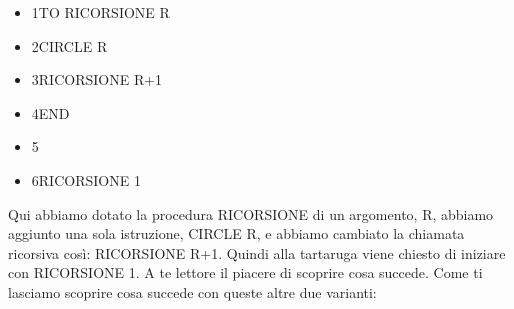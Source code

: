 \begin{table}[H]
\begin{minipage}{1.0\textwidth}
\begin{itemize}[itemsep=-3pt,parsep=2pt]
\item[] \hspace{0.5cm}  1\hspace{8pt}TO RICORSIONE R 
\item[] \hspace{0.5cm}  2\hspace{8pt}\hspace{8pt}CIRCLE R
\item[] \hspace{0.5cm}  3\hspace{8pt}\hspace{8pt}RICORSIONE R+1
\item[] \hspace{0.5cm}	4\hspace{8pt}END
\item[] \hspace{0.5cm}  5\hspace{8pt}
\item[] \hspace{0.5cm}  6\hspace{8pt}RICORSIONE 1
\end{itemize}          	          
\end{minipage}
\end{table}
\vskip 1cm

Qui abbiamo dotato la procedura RICORSIONE di un argomento, R, abbiamo aggiunto una sola istruzione, CIRCLE R, e abbiamo cambiato la chiamata ricorsiva così: RICORSIONE R+1. Quindi alla tartaruga viene chiesto di iniziare con RICORSIONE 1. A te lettore il piacere di scoprire cosa succede. Come ti lasciamo scoprire cosa succede con queste altre due varianti:

\vskip 1cm

